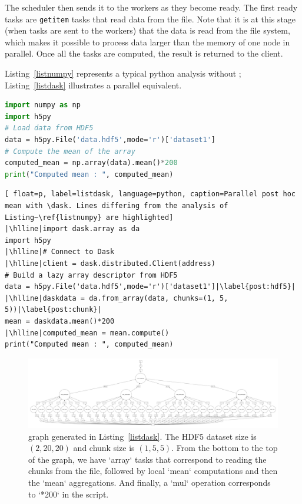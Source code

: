 The scheduler then sends it to the workers as they become ready. 
The first ready tasks are \texttt{getitem} tasks that read data from the file.  
Note that it is at this stage (when tasks are sent to the workers) that the data is read from the file system, which makes it possible to process data larger than the memory of one node in parallel.
Once all the tasks are computed, the result is returned to the client.

Listing~\ref{listnumpy} represents a typical python analysis without \dask; Listing~\ref {listdask} illustrates a \dask parallel equivalent. 

\begin{lstlisting}[float=p, label=listnumpy, language=python, caption=Sequential post hoc mean using numpy]
import numpy as np
import h5py
# Load data from HDF5
data = h5py.File('data.hdf5',mode='r')['dataset1']
# Compute the mean of the array
computed_mean = np.array(data).mean()*200
print("Computed mean : ", computed_mean)
\end{lstlisting}

\begin{lstlisting}[ float=p, label=listdask, language=python, caption=Parallel post hoc mean with \dask. Lines differing from the analysis of Listing~\ref{listnumpy} are highlighted]
|\hlline|import dask.array as da
import h5py
|\hlline|# Connect to Dask
|\hlline|client = dask.distributed.Client(address)
# Build a lazy array descriptor from HDF5
data = h5py.File('data.hdf5',mode='r')['dataset1']|\label{post:hdf5}|
|\hlline|daskdata = da.from_array(data, chunks=(1, 5, 5))|\label{post:chunk}|
mean = daskdata.mean()*200
|\hlline|computed_mean = mean.compute()
print("Computed mean : ", computed_mean)
\end{lstlisting}

\begin{figure}[p]\centering
\includegraphics[scale=0.145, angle=90]{figures/mean.pdf}
\caption{\dask graph generated in Listing~\ref{listdask}. The HDF5 dataset size is $(2, 20, 20)$ and chunk size is $(1, 5, 5)$. From the bottom to the top of the graph, we have `array` tasks that correspond to reading the chunks from the file, followed by local `mean` computations and then the `mean` aggregations. And finally, a `mul` operation corresponds to `*200` in the script.}
\label{figtaskmean}
\end{figure}


